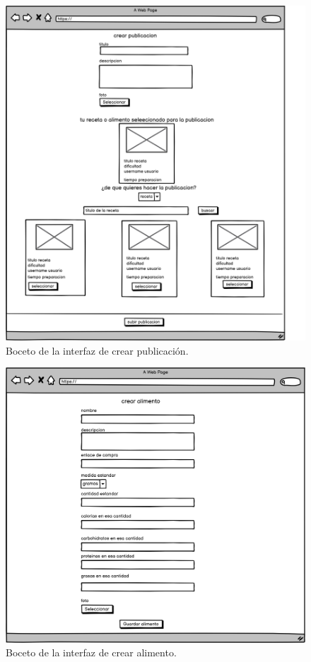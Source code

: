       \begin{figure}[H]
    \centering
    \includegraphics[scale=0.20]{img/crear-publicacion.jpg}
    \caption{Boceto de la interfaz de crear publicación.}
    \label{fig:crear-publicacion}
\end{figure}


   \begin{figure}[H]
    \centering
    \includegraphics[scale=0.20]{img/crear-alimento.jpg}
    \caption{Boceto de la interfaz de crear alimento.}
    \label{fig:crear-alimento}
\end{figure}
    
